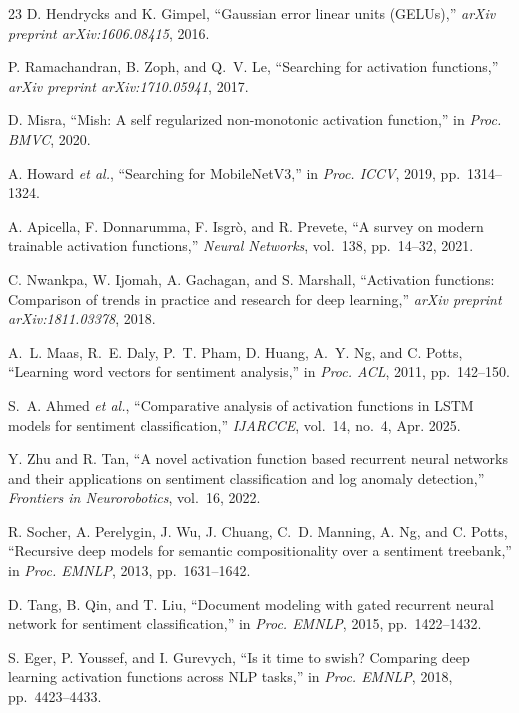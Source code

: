 \documentclass[conference]{IEEEtran}
\begin{document}
\begin{thebibliography}{23}
D. Hendrycks and K. Gimpel,
``Gaussian error linear units (GELUs),''
\textit{arXiv preprint arXiv:1606.08415}, 2016.

P. Ramachandran, B. Zoph, and Q.~V. Le,
``Searching for activation functions,''
\textit{arXiv preprint arXiv:1710.05941}, 2017.

D. Misra,
``Mish: A self regularized non-monotonic activation function,''
in \textit{Proc. BMVC}, 2020.

A. Howard \textit{et al.},
``Searching for MobileNetV3,''
in \textit{Proc. ICCV}, 2019, pp.~1314--1324.

A. Apicella, F. Donnarumma, F. Isgr\`{o}, and R. Prevete,
``A survey on modern trainable activation functions,''
\textit{Neural Networks}, vol.~138, pp.~14--32, 2021.

C. Nwankpa, W. Ijomah, A. Gachagan, and S. Marshall,
``Activation functions: Comparison of trends in practice and research for
deep learning,''
\textit{arXiv preprint arXiv:1811.03378}, 2018.


A.~L. Maas, R.~E. Daly, P.~T. Pham, D. Huang, A.~Y. Ng, and C. Potts,
``Learning word vectors for sentiment analysis,''
in \textit{Proc. ACL}, 2011, pp.~142--150.

S.~A. Ahmed \textit{et al.},
``Comparative analysis of activation functions in LSTM models for sentiment
classification,''
\textit{IJARCCE}, vol.~14, no.~4, Apr. 2025.

Y. Zhu and R. Tan,
``A novel activation function based recurrent neural networks and their
applications on sentiment classification and log anomaly detection,''
\textit{Frontiers in Neurorobotics}, vol.~16, 2022.

R. Socher, A. Perelygin, J. Wu, J. Chuang, C.~D. Manning, A. Ng,
and C. Potts,
``Recursive deep models for semantic compositionality over a sentiment
treebank,''
in \textit{Proc. EMNLP}, 2013, pp.~1631--1642.

D. Tang, B. Qin, and T. Liu,
``Document modeling with gated recurrent neural network for sentiment
classification,''
in \textit{Proc. EMNLP}, 2015, pp.~1422--1432.


S. Eger, P. Youssef, and I. Gurevych,
``Is it time to swish? Comparing deep learning activation functions across
NLP tasks,''
in \textit{Proc. EMNLP}, 2018, pp.~4423--4433.


\end{thebibliography}
\end{document}
